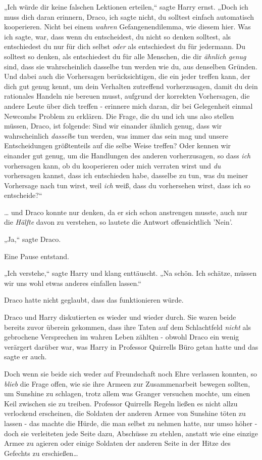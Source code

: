 {„Ich würde dir keine falschen Lektionen erteilen,“ sagte Harry ernst. „Doch ich muss dich daran erinnern, Draco, ich sagte nicht, du solltest einfach automatisch kooperieren. Nicht bei einem \emph{wahren} Gefangenendilemma, wie diesem hier. Was ich sagte, war, dass wenn du entscheidest, du nicht so denken solltest, als entschiedest du nur für dich selbst \emph{oder} als entschiedest du für jedermann. Du solltest so denken, als entschiedest du für alle Menschen, die dir \emph{ähnlich genug} sind, dass sie wahrscheinlich dasselbe tun werden wie du, aus denselben Gründen. Und dabei auch die Vorhersagen berücksichtigen, die ein jeder treffen kann, der dich gut genug kennt, um dein Verhalten zutreffend vorherzusagen, damit du dein rationales Handeln nie bereuen musst, aufgrund der korrekten Vorhersagen, die andere Leute über dich treffen - erinnere mich daran, dir bei Gelegenheit einmal Newcombs Problem zu erklären. Die Frage, die du und ich uns also stellen müssen, Draco, ist folgende: Sind wir einander ähnlich genug, dass wir wahrscheinlich \emph{dasselbe} tun werden, was immer das sein mag und unsere Entscheidungen größtenteils auf die selbe Weise treffen? Oder kennen wir einander gut genug, um die Handlungen des anderen vorherzusagen, so dass \emph{ich} vorhersagen kann, ob du kooperieren oder mich verraten wirst und \emph{du} vorhersagen kannst, dass ich entschieden habe, dasselbe zu tun, was du meiner Vorhersage nach tun wirst, weil \emph{ich} weiß, dass du vorhersehen wirst, dass ich so entscheide?“

… und Draco konnte nur denken, da er sich schon anstrengen musste, auch nur die \emph{Hälfte} davon zu verstehen, so lautete die Antwort offensichtlich 'Nein'.

„Ja,“ sagte Draco.

Eine Pause entstand.

„Ich verstehe,“ sagte Harry und klang enttäuscht. „Na schön. Ich schätze, müssen wir uns wohl etwas anderes einfallen lassen.“

Draco hatte nicht geglaubt, dass das funktionieren würde.

Draco und Harry diskutierten es wieder und wieder durch. Sie waren beide bereits zuvor überein gekommen, dass ihre Taten auf dem Schlachtfeld \emph{nicht} als gebrochene Versprechen im wahren Leben zählten - obwohl Draco ein wenig verärgert darüber war, was Harry in Professor Quirrells Büro getan hatte und das sagte er auch.

Doch wenn sie beide sich weder auf Freundschaft noch Ehre verlassen konnten, so \emph{blieb} die Frage offen, wie sie ihre Armeen zur Zusammenarbeit bewegen sollten, um Sunshine zu schlagen, trotz allem was Granger versuchen mochte, um einen Keil zwischen sie zu treiben. Professor Quirrells Regeln ließen es nicht allzu verlockend erscheinen, die Soldaten der anderen Armee von Sunshine töten zu lassen - das machte die Hürde, die man selbst zu nehmen hatte, nur umso höher - doch sie verleiteten jede Seite dazu, Abschüsse zu stehlen, anstatt wie eine einzige Armee zu agieren oder einige Soldaten der anderen Seite in der Hitze des Gefechts zu erschießen…

}
